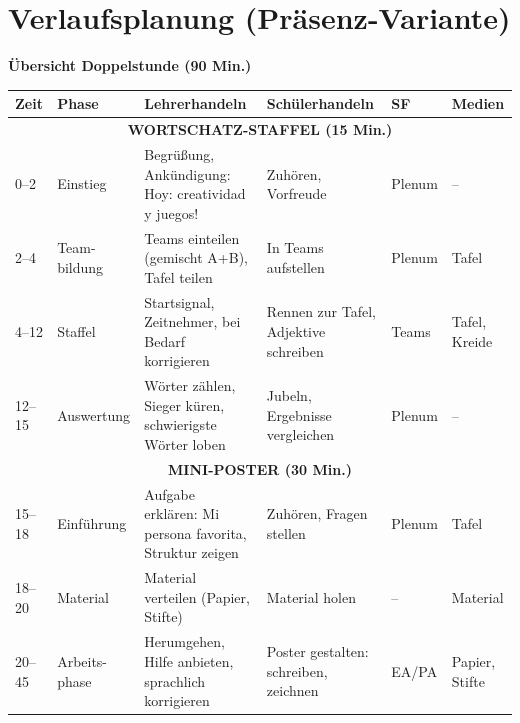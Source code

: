 \documentclass[11pt,a4paper]{article}
\begin{document}
\section{Verlaufsplanung (Präsenz-Variante)}

\textbf{Übersicht Doppelstunde (90 Min.)}

\begin{longtable}{|p{0.8cm}|p{1.8cm}|p{3.8cm}|p{3cm}|p{1.3cm}|p{2cm}|}
\hline
\textbf{Zeit} & \textbf{Phase} & \textbf{Lehrerhandeln} & \textbf{Schülerhandeln} & \textbf{SF} & \textbf{Medien} \\
\hline
\endhead

\multicolumn{6}{|c|}{\textbf{WORTSCHATZ-STAFFEL (15 Min.)}} \\
\hline

0--2 & Einstieg & Begrüßung, Ankündigung: \glqq{}Hoy: creatividad y juegos!\grqq{} & Zuhören, Vorfreude & Plenum & -- \\
\hline

2--4 & Team-bildung & Teams einteilen (gemischt A+B), Tafel teilen & In Teams aufstellen & Plenum & Tafel \\
\hline

4--12 & Staffel & Startsignal, Zeitnehmer, bei Bedarf korrigieren & Rennen zur Tafel, Adjektive schreiben & Teams & Tafel, Kreide \\
\hline

12--15 & Auswertung & Wörter zählen, Sieger küren, schwierigste Wörter loben & Jubeln, Ergebnisse vergleichen & Plenum & -- \\
\hline

\multicolumn{6}{|c|}{\textbf{MINI-POSTER (30 Min.)}} \\
\hline

15--18 & Einführung & Aufgabe erklären: \glqq{}Mi persona favorita\grqq{}, Struktur zeigen & Zuhören, Fragen stellen & Plenum & Tafel \\
\hline

18--20 & Material & Material verteilen (Papier, Stifte) & Material holen & -- & Material \\
\hline

20--45 & Arbeits-phase & Herumgehen, Hilfe anbieten, sprachlich korrigieren & Poster gestalten: schreiben, zeichnen & EA/PA & Papier, Stifte \\
\hline


\end{longtable}
\end{document}
